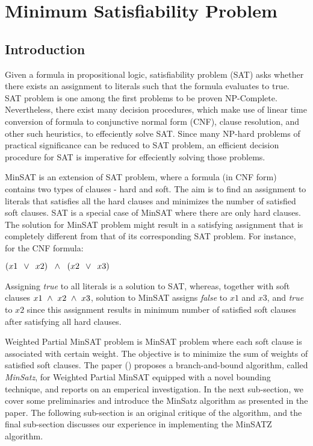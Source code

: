 \section{Minimum Satisfiability Problem}
\label{sec:minsat}

\subsection{Introduction}
Given a formula in propositional logic, satisfiability problem (SAT) asks
whether there exists an assignment to literals such that the formula evaluates
to true. SAT problem is one among the first problems to be proven NP-Complete.
Nevertheless, there exist many decision procedures, which make use of linear
time conversion of formula to conjunctive normal form (CNF), clause resolution,
and other such heuristics, to effeciently solve SAT.  Since many NP-hard
problems of practical significance can be reduced to SAT problem, an efficient
decision procedure for SAT is imperative for effeciently solving those problems.

MinSAT is an extension of SAT problem, where a formula (in CNF form) contains
two types of clauses - hard and soft. The aim is to find an assignment to
literals that satisfies all the hard clauses and minimizes the number of
satisfied soft clauses. SAT is a special case of MinSAT where there are only
hard clauses. The solution for MinSAT problem might result in a satisfying
assignment that is completely different from that of its corresponding SAT
problem. For instance, for the CNF formula:
\begin{center}
  \(
    (x1 \, ~\vee~ \, x2) \; ~\wedge~ \; (x2 \, ~\vee~ \, x3)
 \)
\end{center}
Assigning \emph{true} to all literals is a solution to SAT, whereas, together
with soft clauses $x1 ~\wedge~ x2 ~\wedge~ x3$, solution to MinSAT assigns
\emph{false} to $x1$ and $x3$, and \emph{true} to $x2$ since this assignment
results in minimum number of satisfied soft clauses after satisfying all hard
clauses.

Weighted Partial MinSAT problem is MinSAT problem where each soft clause is
associated with certain weight. The objective is to minimize the sum of weights
of satisfied soft clauses. The paper (\cite{minsat}) proposes a branch-and-bound
algorithm, called \emph{MinSatz}, for Weighted Partial MinSAT equipped with a
novel bounding technique, and reports on an emperical investigation. In the next
sub-section, we cover some preliminaries and introduce the MinSatz algorithm as
presented in the paper. The following sub-section is an original critique of the
algorithm, and the final sub-section discusses our experience in implementing
the MinSATZ algorithm.

